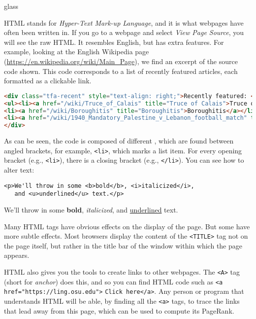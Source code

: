 \begin{tblsfilledsymbol}{}{glass} 
\begin{underthehood}
\label{uth:html}

HTML stands for \emph{Hyper-Text Mark-up Language}, and it is what
webpages have often been written in.    If you go to a webpage
and select \emph{View Page Source}, you will see the raw HTML.
It resembles English, but has extra features.
For example, looking at the
English Wikipedia page (\url{https://en.wikipedia.org/wiki/Main_Page}),
we find an excerpt of the source code shown.  This code corresponds to a list of recently featured articles, each formatted as a clickable link. 

\begin{lstlisting}[language=HTML]
<div class="tfa-recent" style="text-align: right;">Recently featured: <div class="hlist hlist-separated inline">
<ul><li><a href="/wiki/Truce_of_Calais" title="Truce of Calais">Truce of Calais</a></li>
<li><a href="/wiki/Boroughitis" title="Boroughitis">Boroughitis</a></li>
<li><a href="/wiki/1940_Mandatory_Palestine_v_Lebanon_football_match" title="1940 Mandatory Palestine v Lebanon football match">1940 Mandatory Palestine v Lebanon football match</a></li></ul>
</div>
\end{lstlisting}


As can be seen, the code is composed of different ,
which are found between angled brackets, for example, \verb#<li>#,
which marks a list item.  For every opening bracket (e.g.,
\verb#<li>#), there is a closing bracket (e.g., \verb#</li>#).  You
can see how to alter text: 


\ea \ea \begin{verbatim}
<p>We'll throw in some <b>bold</b>, <i>italicized</i>,
   and <u>underlined</u> text.</p>
    \end{verbatim}
    \ex We'll throw in some \textbf{bold}, \textit{italicized}, and
\uline{underlined} text.
\z 
\z 



Many HTML tags have obvious effects on the display of the
page. But some have more subtle effects. Most browsers display the
content of the \verb#<TITLE># tag not on the page itself, but rather
in the title bar of the window within which the page appears.

HTML also gives you the tools to create links to other webpages.  The
\verb#<A># tag (short for \emph{anchor}) does this, and so you can
find HTML code such as \verb#<a href="https://ling.osu.edu">#
\verb#Click here</a>#.  Any person or program that understands HTML
will be able, by finding all the \verb#<a># tags, to trace the links
that lead away from this page, which can be used to compute its
PageRank.

\end{underthehood}
\end{tblsfilledsymbol}



